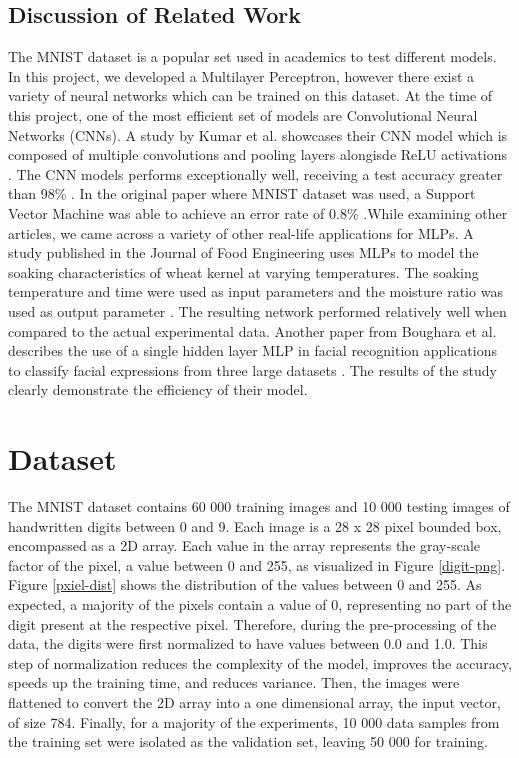 \documentclass[11pt]{homework}
\begin{document}
\subsection{Discussion of Related Work}
The MNIST dataset is a popular set used in academics to test different models. In this project, we developed a Multilayer Perceptron, however there exist a variety of neural networks which can be trained on this dataset. At the time of this project, one of the most efficient set of models are Convolutional Neural Networks (CNNs). A study by Kumar et al. showcases their CNN model which is composed of multiple convolutions and pooling layers alongisde ReLU activations \cite{garg2019validation}. The CNN models performs exceptionally well, receiving a test accuracy greater than 98\% \cite{garg2019validation}. In the original paper where MNIST dataset was used, a Support Vector Machine was able to achieve an error rate of 0.8\% \cite{lecun1998gradient}.While examining other articles, we came across a variety of other real-life applications for MLPs. A study published in the Journal of Food Engineering uses MLPs to model the soaking characteristics of wheat kernel at varying temperatures. The soaking temperature and time were used as input parameters and the moisture ratio was used as output parameter \cite{kashaninejad2009modeling}. The resulting network performed relatively well when compared to the actual experimental data. Another paper from Boughara et al. describes the use of a single hidden layer MLP in facial recognition applications to classify facial expressions from three large datasets \cite{boughrara2016facial}. The results of the study clearly demonstrate the efficiency of their model. 


\section{Dataset}
The MNIST dataset contains 60 000 training images and 10 000 testing images of handwritten digits between 0 and 9. Each image is a 28 x 28 pixel bounded box, encompassed as a 2D array. Each value in the array represents the gray-scale factor of the pixel, a value between 0 and 255, as visualized in Figure \ref{digit-png}.  Figure \ref{pxiel-dist} shows the distribution of the values between 0 and 255. As expected, a majority of the pixels contain a value of 0, representing no part of the digit present at the respective pixel. Therefore, during the pre-processing of the data, the digits were first normalized to have values between 0.0 and 1.0. This step of normalization reduces the complexity of the model, improves the accuracy, speeds up the training time, and reduces variance. Then, the images were flattened to convert the 2D array into a one dimensional array, the input vector, of size 784. Finally, for a majority of the experiments, 10 000 data samples from the training set were isolated as the validation set, leaving 50 000 for training.
\end{document}
